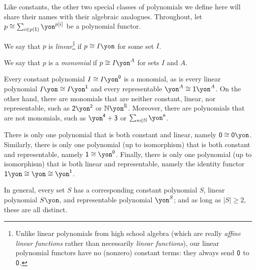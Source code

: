 \documentclass[Book-Poly]{subfiles}
\begin{document}
Like constants, the other two special classes of polynomials we define here will share their names with their algebraic analogues.
Throughout, let $p\iso\sum_{i\in p(\1)}\yon^{p[i]}$ be a polynomial functor.

\begin{definition}[Linear]
We say that $p$ is \emph{linear}\footnote{Unlike linear polynomials from high school algebra (which are really \emph{affine linear functions} rather than necessarily \emph{linear functions}), our linear polynomial functors have no (nonzero) constant terms: they always send $\textsf{0}$ to $\textsf{0}$.}
if $p\iso I\yon$ for some set $I$.
\end{definition}

\begin{definition}[Monomial]
We say that $p$ is a \emph{monomial} if $p\iso I\yon^A$ for sets $I$ and $A$.
\end{definition}

\begin{example}
  Every constant polynomial $I\iso I\yon^\0$ is a monomial, as is every linear polynomial $I\yon\iso I\yon^\1$ and every representable $\yon^A \iso \1\yon^A$.
  On the other hand, there are monomials that are neither constant, linear, nor representable, such as $\2\yon^\2$ or $\nn\yon^\rr$.
  Moreover, there are polynomials that are not monomials, such as $\yon^\4+\3$ or $\sum_{n\in\nn}\yon^{\ord{n}}$.

  There is only one polynomial that is both constant and linear, namely $\0\iso\0\yon$.
  Similarly, there is only one polynomial (up to isomorphism) that is both constant and representable, namely $\1\iso\yon^\0$.
  Finally, there is only one polynomial (up to isomorphism) that is both linear and representable, namely the identity functor $\1\yon\iso\yon\iso\yon^\1$.

  In general, every set $S$ has a corresponding constant polynomial $S$, linear polynomial $S\yon$, and representable polynomial $\yon^S$; and as long as $|S|\geq2$, these are all distinct.
\end{example}
\end{document}
